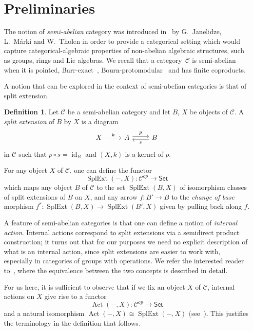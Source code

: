 \documentclass[reqno,hidelinks,a4paper]{amsart}
\theoremstyle{plain}
\theoremstyle{definition}
\newtheorem{definition}[subsection]{Definition}
\theoremstyle{remark}
\numberwithin{equation}{section}
\newcommand{\C}{\ensuremath{\mathcal{C}}}
\DeclareMathOperator{\Act}{Act}
\DeclareMathOperator{\SplExt}{SplExt}
\DeclareMathOperator{\id}{id}
\newcommand{\Set}{\ensuremath{\mathsf{Set}}}
\begin{document}
\section{Preliminaries}\label{SecPrel}

The notion of \emph{semi-abelian} category was introduced in~\cite{Semi-Ab} by G.~Janelidze, L.~Márki and W.~Tholen in order to provide a categorical setting which would capture categorical-algebraic properties of non-abelian algebraic structures, such as groups, rings and Lie algebras. We recall that a category~\(\C\) is
semi-abelian when it is pointed, Barr-exact~\cite{Barr}, Bourn-protomodular~\cite{Bourn} and has finite coproducts.

A notion that can be explored in the context of semi-abelian categories is that of split extension.

\begin{definition}
    Let \(\C\) be a semi-abelian category and let \(B\), \(X\) be objects of \(\C\). A \emph{split extension} of \(B\) by \(X\) is a diagram
    \begin{equation*}\label{eq:split_ext}
        \begin{tikzcd}
            X\arrow [r, "k"]
            &A \arrow[r, shift left, "p"] &
            B\ar[l, shift left, "s"]
        \end{tikzcd}
    \end{equation*}
    in \(\C\) such that \(p \circ s = \id_B\) and \((X,k)\) is a kernel of \(p\).
\end{definition}

For any object \(X\) of \(\C\), one can define the functor
\[
    \SplExt(-,X) \colon \C^{op} \to \Set
\]
which maps any object \(B\) of \(\C\) to the set \(\SplExt(B,X)\) of isomorphism classes of split extensions of \(B\) on \(X\), and any arrow \(f\colon B'\to B\) to the \emph{change of base} morphism \(f^*\colon \SplExt(B,X) \to \SplExt(B',X)\) given by pulling back along \(f\).

A feature of semi-abelian categories is that one can define a notion of \emph{internal action}. Internal actions correspond to split extensions via a semidirect product construction; it turns out that for our purposes we need no explicit description of what is an internal action, since split extensions are easier to work with, especially in categories of groups with operations. We refer the interested reader to~\cite{BJK2}, where the equivalence between the two concepts is described in detail.

For us here, it is sufficient to observe that if we fix an
object \(X\) of \(\C\), internal actions on \(X\) give rise to a functor
\[
    \Act(-,X)\colon \C^{op} \to \Set
\]
and a natural isomorphism \(\Act(-,X)\cong \SplExt(-,X)\) (see~\cite{BJK2}). This justifies the terminology in the definition that follows.
\end{document}
